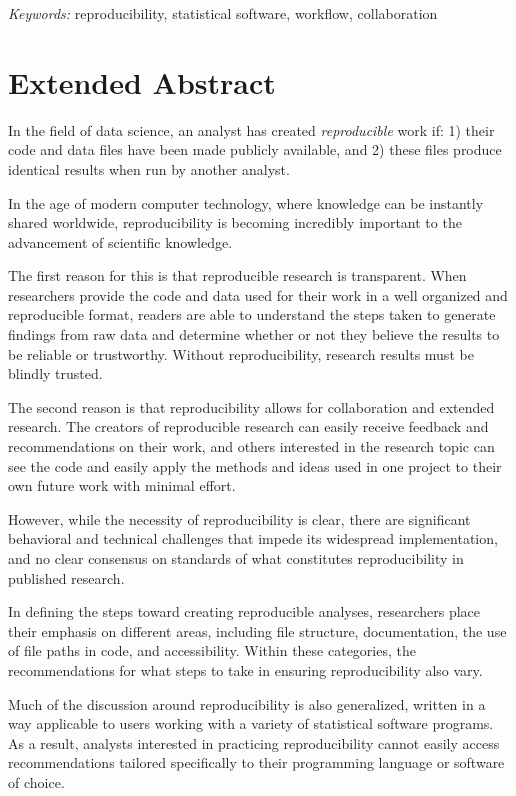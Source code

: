 \documentclass[12pt]{article}
\begin{document}
\noindent%
{\it Keywords:} reproducibility, statistical software, workflow, collaboration
\vfill

\newpage
{} %

\section{Extended Abstract}\label{extended-abstract}

In the field of data science, an analyst has created \emph{reproducible}
work if: 1) their code and data files have been made publicly available,
and 2) these files produce identical results when run by another
analyst.

In the age of modern computer technology, where knowledge can be
instantly shared worldwide, reproducibility is becoming incredibly
important to the advancement of scientific knowledge.

The first reason for this is that reproducible research is transparent.
When researchers provide the code and data used for their work in a well
organized and reproducible format, readers are able to understand the
steps taken to generate findings from raw data and determine whether or
not they believe the results to be reliable or trustworthy. Without
reproducibility, research results must be blindly trusted.

The second reason is that reproducibility allows for collaboration and
extended research. The creators of reproducible research can easily
receive feedback and recommendations on their work, and others
interested in the research topic can see the code and easily apply the
methods and ideas used in one project to their own future work with
minimal effort.

However, while the necessity of reproducibility is clear, there are
significant behavioral and technical challenges that impede its
widespread implementation, and no clear consensus on standards of what
constitutes reproducibility in published research.

In defining the steps toward creating reproducible analyses, researchers
place their emphasis on different areas, including file structure,
documentation, the use of file paths in code, and accessibility. Within
these categories, the recommendations for what steps to take in ensuring
reproducibility also vary.

Much of the discussion around reproducibility is also generalized,
written in a way applicable to users working with a variety of
statistical software programs. As a result, analysts interested in
practicing reproducibility cannot easily access recommendations tailored
specifically to their programming language or software of choice.
\end{document}
